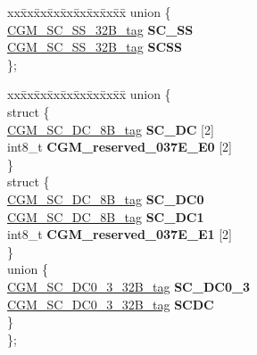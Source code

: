 \begin{DoxyCompactItemize}
\begin{tabbing}
\end{tabbing}\item 
\mbox{\label{structCGM__struct__tag_a1dc4996c2381de81a0d87662ebf2e61d}} 
\begin{tabbing}
xx\=xx\=xx\=xx\=xx\=xx\=xx\=xx\=xx\=\kill
union \{\\
\>\mbox{\hyperlink{unionCGM__SC__SS__32B__tag}{CGM\_SC\_SS\_32B\_tag}} {\bfseries SC\_SS}\\
\>\mbox{\hyperlink{unionCGM__SC__SS__32B__tag}{CGM\_SC\_SS\_32B\_tag}} {\bfseries SCSS}\\
\}; \\

\end{tabbing}\item 
\mbox{\label{structCGM__struct__tag_aea9f240cc266bc428f34c00b82f0c5b4}} 
\begin{tabbing}
xx\=xx\=xx\=xx\=xx\=xx\=xx\=xx\=xx\=\kill
union \{\\
\mbox{\label{unionCGM__struct__tag_1_1_0D1676_a4fc88fdf450dd5437286821c74cdea33}} 
\>struct \{\\
\>\>\mbox{\hyperlink{unionCGM__SC__DC__8B__tag}{CGM\_SC\_DC\_8B\_tag}} {\bfseries SC\_DC} \mbox{[}2\mbox{]}\\
\>\>int8\_t {\bfseries CGM\_reserved\_037E\_E0} \mbox{[}2\mbox{]}\\
\>\} \\
\mbox{\label{unionCGM__struct__tag_1_1_0D1676_aa90335772f03933ee55a2b37ac61f7e9}} 
\>struct \{\\
\>\>\mbox{\hyperlink{unionCGM__SC__DC__8B__tag}{CGM\_SC\_DC\_8B\_tag}} {\bfseries SC\_DC0}\\
\>\>\mbox{\hyperlink{unionCGM__SC__DC__8B__tag}{CGM\_SC\_DC\_8B\_tag}} {\bfseries SC\_DC1}\\
\>\>int8\_t {\bfseries CGM\_reserved\_037E\_E1} \mbox{[}2\mbox{]}\\
\>\} \\
\mbox{\label{unionCGM__struct__tag_1_1_0D1676_a2d0392890e962bd41b7851c09571366a}} 
\>union \{\\
\>\>\mbox{\hyperlink{unionCGM__SC__DC0__3__32B__tag}{CGM\_SC\_DC0\_3\_32B\_tag}} {\bfseries SC\_DC0\_3}\\
\>\>\mbox{\hyperlink{unionCGM__SC__DC0__3__32B__tag}{CGM\_SC\_DC0\_3\_32B\_tag}} {\bfseries SCDC}\\
\>\} \\
\}; \\


\end{tabbing}
\end{DoxyCompactItemize}
